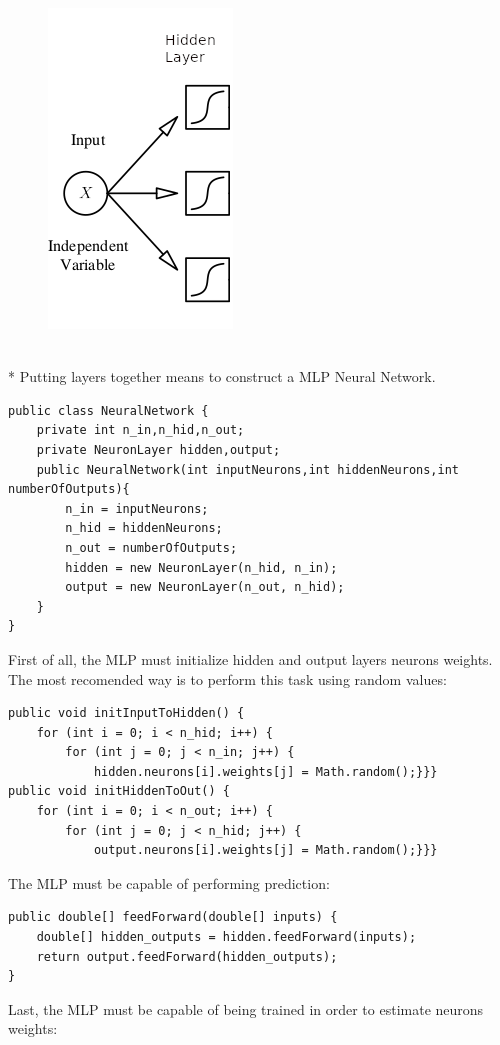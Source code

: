 \documentclass[10pt,a4paper]{article}
\begin{document}
\begin{figure}[h!]
	\centering
	\includegraphics[scale=1.4]{img/hiddenlayer}
	\label{fig:hiddenlayer}
\end{figure}\\*
Putting layers together means to construct a MLP Neural Network.
\begin{lstlisting}
public class NeuralNetwork {
	private int n_in,n_hid,n_out;
	private NeuronLayer hidden,output;
	public NeuralNetwork(int inputNeurons,int hiddenNeurons,int numberOfOutputs){
		n_in = inputNeurons;
		n_hid = hiddenNeurons;
		n_out = numberOfOutputs;
		hidden = new NeuronLayer(n_hid, n_in);
		output = new NeuronLayer(n_out, n_hid);
	}
}
\end{lstlisting}
First of all, the MLP must initialize hidden and output layers neurons weights. The most recomended way is to perform this task using random values:
\begin{lstlisting}
public void initInputToHidden() {
	for (int i = 0; i < n_hid; i++) {
		for (int j = 0; j < n_in; j++) {
			hidden.neurons[i].weights[j] = Math.random();}}}
public void initHiddenToOut() {
	for (int i = 0; i < n_out; i++) {
		for (int j = 0; j < n_hid; j++) {
			output.neurons[i].weights[j] = Math.random();}}}
\end{lstlisting}
The MLP must be capable of performing prediction:
\begin{lstlisting}
public double[] feedForward(double[] inputs) {
	double[] hidden_outputs = hidden.feedForward(inputs);
	return output.feedForward(hidden_outputs);
}
\end{lstlisting}
Last, the MLP must be capable of being trained in order to estimate neurons weights:
\end{document}
